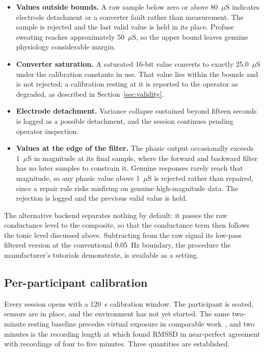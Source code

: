 \begin{itemize}
    \item \textbf{Values outside bounds.} A raw sample below zero
    or above 80~$\mu$S indicates electrode detachment or a
    converter fault rather than measurement. The sample is
    rejected and the last valid value is held in its place.
    Profuse sweating reaches approximately 50~$\mu$S, so the
    upper bound leaves genuine physiology considerable margin.
    \item \textbf{Converter saturation.} A saturated 16-bit
    value converts to exactly 25.0~$\mu$S under the calibration
    constants in use. That value lies within the bounds and is
    not rejected; a calibration resting at it is reported to the
    operator as degraded, as described in
    Section~\ref{sec:validity}.
    \item \textbf{Electrode detachment.} Variance collapse
    sustained beyond fifteen seconds is logged as a possible
    detachment, and the session continues pending operator
    inspection.
    \item \textbf{Values at the edge of the filter.} The phasic
    output occasionally exceeds 1~$\mu$S in magnitude at its
    final sample, where the forward and backward filter has no
    later samples to constrain it. Genuine responses rarely reach
    that magnitude, so any phasic value above 1~$\mu$S is
    rejected rather than repaired, since a repair rule risks
    misfiring on genuine high-magnitude data. The rejection is logged and the
    previous valid value is held.
\end{itemize}

The alternative backend separates nothing by default: it passes
the raw conductance level to the composite, so that the
conductance term then follows the tonic level discussed above.
Subtracting from the raw signal its low-pass filtered version at
the conventional 0.05~Hz boundary, the procedure the
manufacturer's tutorials demonstrate, is available as a setting.

\subsection{Per-participant calibration}
\label{sec:calibration}

Every session opens with a 120~s calibration window. The
participant is seated, sensors are in place, and the environment
has not yet started. The same two-minute resting baseline precedes
virtual exposure in comparable work~\citep{reitmaier2022}, and two
minutes is the recording length at which \citet{munoz2015} found
RMSSD in near-perfect agreement with recordings of four to five
minutes. Three quantities are established.

